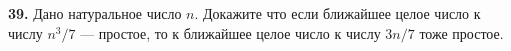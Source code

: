 \documentclass [a5paper,12pt]{article}%
\def\q#1.{{\bf #1.}}
\begin{document}
\begin{small}

	\q39. Дано натуральное число $n$.  Докажите что если ближайшее целое число к числу $n^3/7$ --- простое, то к ближайшее целое число к числу $3n/7$ тоже простое.


\end{small}
\end{document}

